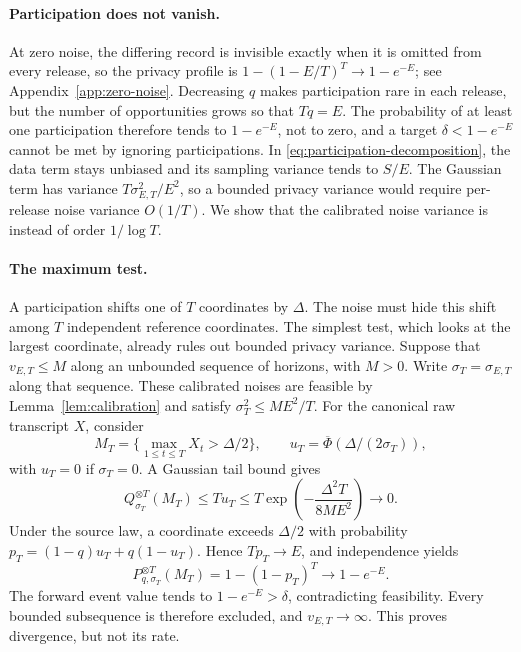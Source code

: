 \documentclass[11pt]{article}
\theoremstyle{remark}
\begin{document}
\paragraph{Participation does not vanish.}
At zero noise, the differing record is invisible exactly when it is omitted
from every release, so the privacy profile is
$1-(1-E/T)^T\to1-e^{-E}$; see Appendix~\ref{app:zero-noise}. Decreasing $q$
makes participation rare in each release, but the number of opportunities
grows so that $Tq=E$. The probability of at least one participation therefore
tends to $1-e^{-E}$, not to zero, and a target
$\delta<1-e^{-E}$ cannot be met by ignoring participations. In
\eqref{eq:participation-decomposition}, the data term stays unbiased and its
sampling variance tends to $S/E$. The Gaussian term has variance
$T\sigma_{E,T}^2/E^2$, so a bounded privacy variance would require
per-release noise variance $O(1/T)$. We show that the calibrated noise
variance is instead of order $1/\log T$.

\paragraph{The maximum test.}
A participation shifts one of $T$ coordinates by $\Delta$. The noise must hide
this shift among $T$ independent reference coordinates. The simplest test,
which looks at the largest coordinate, already rules out bounded privacy
variance. Suppose that $v_{E,T}\leq M$ along an unbounded sequence of
horizons, with $M>0$. Write $\sigma_T=\sigma_{E,T}$ along that sequence.
These calibrated noises are feasible by Lemma~\ref{lem:calibration} and
satisfy $\sigma_T^2\leq ME^2/T$. For the canonical raw transcript $X$,
consider
\[
 M_T=\{\max_{1\leq t\leq T}X_t>\Delta/2\},\qquad
 u_T=\overline\Phi(\Delta/(2\sigma_T)),
\]
with $u_T=0$ if $\sigma_T=0$. A Gaussian tail bound gives
\[
 Q_{\sigma_T}^{\otimes T}(M_T)\leq Tu_T
 \leq T\exp\!\left(-\frac{\Delta^2T}{8ME^2}\right)\longrightarrow0.
\]
Under the source law, a coordinate exceeds $\Delta/2$ with probability
$p_T=(1-q)u_T+q(1-u_T)$. Hence $Tp_T\to E$, and independence yields
\[
 P_{q,\sigma_T}^{\otimes T}(M_T)=1-(1-p_T)^T\longrightarrow1-e^{-E}.
\]
The forward event value tends to $1-e^{-E}>\delta$, contradicting
feasibility. Every bounded subsequence is therefore excluded, and
$v_{E,T}\to\infty$. This proves divergence, but not its rate.
\end{document}
